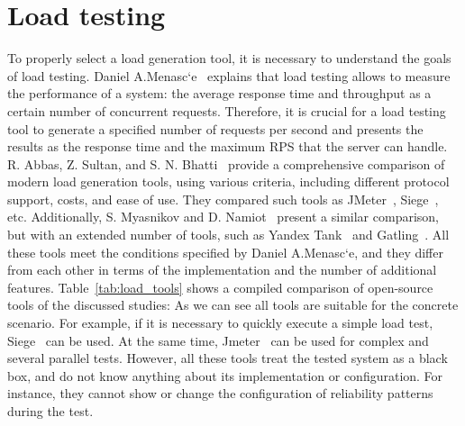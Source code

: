 \section{Load testing}\label{sec:load_generation}
To properly select a load generation tool, it is necessary to understand the goals of load testing. Daniel A.Menasc`e~\cite{load_testing_base} explains that load testing allows to measure the performance of a system: the average response time and throughput as a certain number of concurrent requests. Therefore, it is crucial for a load testing tool to generate a specified number of requests per second and presents the results as the response time and the maximum RPS that the server can handle.
R. Abbas, Z. Sultan, and S. N. Bhatti~\cite{load_testing_tools} provide a comprehensive comparison of modern load generation tools, using various criteria, including different protocol support, costs, and ease of use. They compared such tools as JMeter~\cite{jmeter}, Siege~\cite{siege}, etc. Additionally, S. Myasnikov and D. Namiot~\cite{load_testing_tools_rus} present a similar comparison, but with an extended number of tools, such as Yandex Tank~\cite{yandex_tank} and Gatling~\cite{gatling}. All these tools meet the conditions specified by Daniel A.Menasc`e, and they differ from each other in terms of the implementation and the number of additional features. Table~\ref{tab:load_tools} shows a compiled comparison of open-source tools of the discussed studies:
As we can see all tools are suitable for the concrete scenario. For example, if it is necessary to quickly execute a simple load test, Siege~\cite{siege} can be used. At the same time, Jmeter~\cite{jmeter} can be used for complex and several parallel tests. However, all these tools treat the tested system as a black box, and do not know anything about its implementation or configuration. For instance, they cannot show or change the configuration of reliability patterns during the test.

